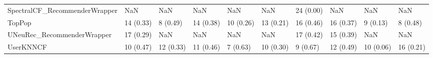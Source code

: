 \begin{tabular}{llllllllll}
      SpectralCF\_RecommenderWrapper &                      NaN &         NaN &           NaN &          NaN &                  NaN &           24 (0.00) &               NaN &                NaN &               NaN \\
                             TopPop &                14 (0.33) &    8 (0.49) &     14 (0.38) &    10 (0.26) &            13 (0.21) &           16 (0.46) &         16 (0.37) &           9 (0.13) &          8 (0.48) \\
         UNeuRec\_RecommenderWrapper &                17 (0.29) &         NaN &           NaN &          NaN &                  NaN &           17 (0.42) &         15 (0.39) &                NaN &               NaN \\
                          UserKNNCF &                10 (0.47) &   12 (0.33) &     11 (0.46) &     7 (0.63) &            10 (0.30) &            9 (0.67) &         12 (0.49) &          10 (0.06) &         16 (0.21) \\
\bottomrule
\end{tabular}
